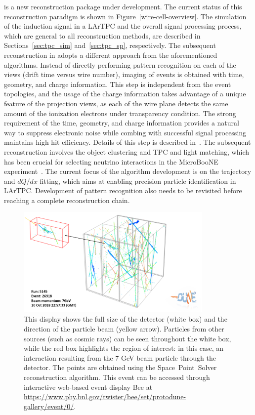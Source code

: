  is a new reconstruction package under development. The current 
status of this reconstruction paradigm is shown in Figure~\ref{wire-cell-overview}. The 
simulation of the induction signal in a LArTPC and the overall signal processing process,
which are general to all reconstruction methods, are described in Sections~\ref{sec:tpc_sim} 
and~\ref{sec:tpc_sp}, respectively. The subsequent reconstruction in  adopts 
a different approach from the aforementioned algorithms. Instead of directly performing pattern 
recognition on each of the \twod views (drift time versus wire number), \threed imaging of events
is obtained with time, geometry, and charge information. This step is independent from 
the event topologies, and the usage of the charge information takes advantage of a unique 
feature of the projection views, as each of the wire plane detects the same 
amount of the ionization electrons under transparency condition. The strong requirement of the time, geometry, and charge 
information provides a natural way to suppress electronic noise
 while combing 
  with successful signal processing maintains high hit efficiency. Details of this step is described in~\cite{Qian:2018qbv}. The subsequent reconstruction involves the object clustering and
TPC and light matching, which has been crucial for selecting neutrino interactions in the 
MicroBooNE experiment~\cite{uboone_wc_note}. The current focus of the  algorithm 
development is on the trajectory and $dQ/dx$ fitting, which aims at enabling precision particle
identification in LArTPC. %
Development of \threed pattern recognition also needs
to be revisited before reaching a complete reconstruction chain. 


\begin{figure}[!ht]
\centering
 \includegraphics[width=0.85\textwidth]{graphics/bee_event.png}
\caption{This \threed display shows the full size of the  detector (white box) and 
the direction of the particle beam (yellow arrow). Particles from other sources (such as cosmic rays) 
can be seen throughout the white box, while the red box highlights the region of interest: 
in this case, an interaction resulting from the 7 GeV beam particle through the detector. 
The \threed points are obtained using the Space~Point~Solver reconstruction algorithm. This event
can be accessed through interactive web-based event display Bee at \url{https://www.phy.bnl.gov/twister/bee/set/protodune-gallery/event/0/}.}
\label{wire-cell-bee}
\end{figure}


